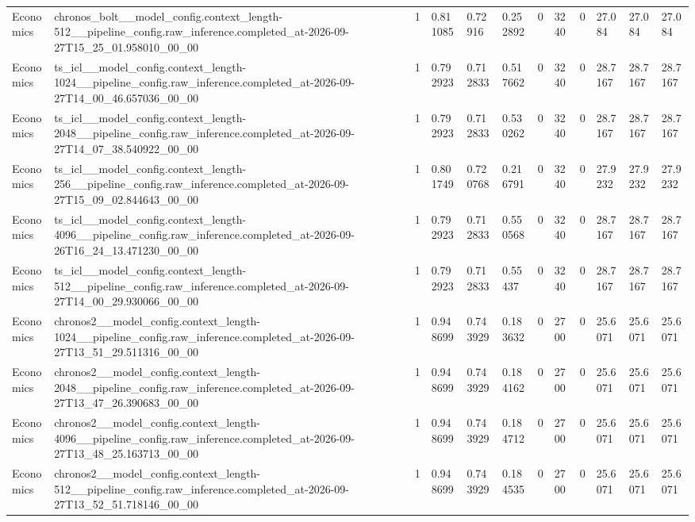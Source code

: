 \begin{tabular}{llllllllllll}
Economics & chronos\_bolt\_\_model\_config.context\_length-512\_\_pipeline\_config.raw\_inference.completed\_at-2026-09-27T15\_25\_01.958010\_00\_00 & 1 & 0.811085 & 0.72916 & 0.252892 & 0 & 3240 & 0 & 27.084 & 27.084 & 27.084 \\
Economics & ts\_icl\_\_model\_config.context\_length-1024\_\_pipeline\_config.raw\_inference.completed\_at-2026-09-27T14\_00\_46.657036\_00\_00 & 1 & 0.792923 & 0.712833 & 0.517662 & 0 & 3240 & 0 & 28.7167 & 28.7167 & 28.7167 \\
Economics & ts\_icl\_\_model\_config.context\_length-2048\_\_pipeline\_config.raw\_inference.completed\_at-2026-09-27T14\_07\_38.540922\_00\_00 & 1 & 0.792923 & 0.712833 & 0.530262 & 0 & 3240 & 0 & 28.7167 & 28.7167 & 28.7167 \\
Economics & ts\_icl\_\_model\_config.context\_length-256\_\_pipeline\_config.raw\_inference.completed\_at-2026-09-27T15\_09\_02.844643\_00\_00 & 1 & 0.801749 & 0.720768 & 0.216791 & 0 & 3240 & 0 & 27.9232 & 27.9232 & 27.9232 \\
Economics & ts\_icl\_\_model\_config.context\_length-4096\_\_pipeline\_config.raw\_inference.completed\_at-2026-09-26T16\_24\_13.471230\_00\_00 & 1 & 0.792923 & 0.712833 & 0.550568 & 0 & 3240 & 0 & 28.7167 & 28.7167 & 28.7167 \\
Economics & ts\_icl\_\_model\_config.context\_length-512\_\_pipeline\_config.raw\_inference.completed\_at-2026-09-27T14\_00\_29.930066\_00\_00 & 1 & 0.792923 & 0.712833 & 0.55437 & 0 & 3240 & 0 & 28.7167 & 28.7167 & 28.7167 \\
Economics & chronos2\_\_model\_config.context\_length-1024\_\_pipeline\_config.raw\_inference.completed\_at-2026-09-27T13\_51\_29.511316\_00\_00 & 1 & 0.948699 & 0.743929 & 0.183632 & 0 & 2700 & 0 & 25.6071 & 25.6071 & 25.6071 \\
Economics & chronos2\_\_model\_config.context\_length-2048\_\_pipeline\_config.raw\_inference.completed\_at-2026-09-27T13\_47\_26.390683\_00\_00 & 1 & 0.948699 & 0.743929 & 0.184162 & 0 & 2700 & 0 & 25.6071 & 25.6071 & 25.6071 \\
Economics & chronos2\_\_model\_config.context\_length-4096\_\_pipeline\_config.raw\_inference.completed\_at-2026-09-27T13\_48\_25.163713\_00\_00 & 1 & 0.948699 & 0.743929 & 0.184712 & 0 & 2700 & 0 & 25.6071 & 25.6071 & 25.6071 \\
Economics & chronos2\_\_model\_config.context\_length-512\_\_pipeline\_config.raw\_inference.completed\_at-2026-09-27T13\_52\_51.718146\_00\_00 & 1 & 0.948699 & 0.743929 & 0.184535 & 0 & 2700 & 0 & 25.6071 & 25.6071 & 25.6071 \\

\end{tabular}
